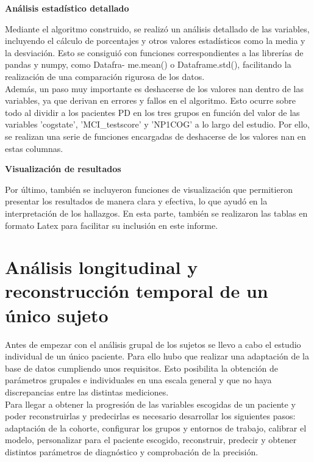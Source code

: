 \begin{description}
	\item {\textbf{Análisis estadístico detallado}} 
	
	Mediante el algoritmo construido, se realizó un análisis detallado de las variables, incluyendo el cálculo de porcentajes y otros valores estadísticos como la media y la desviación. Esto se consiguió con funciones correspondientes a las librerías de pandas y numpy, como Datafra-
	me.mean() o Dataframe.std(), facilitando la realización de una comparación rigurosa de los datos. \\
	
	Además, un paso muy importante es deshacerse de los valores nan dentro de las variables, ya que derivan en errores y fallos en el algoritmo. Esto ocurre sobre todo al dividir a los pacientes PD en los tres grupos en función del valor de las variables 'cogstate', 'MCI\_testscore' y 'NP1COG' a lo largo del estudio. Por ello, se realizan una serie de funciones encargadas de deshacerse de los valores nan en estas columnas.\\	
	
	\item {\textbf{Visualización de resultados}} 
	
	Por último, también se incluyeron funciones de visualización que permitieron presentar los resultados de manera clara y efectiva, lo que ayudó en la interpretación de los hallazgos. En esta parte, también se realizaron las tablas en formato Latex para facilitar su inclusión en este informe.
\end{description}

\section{Análisis longitudinal y reconstrucción temporal de un único sujeto}\label{sec:Análisis de un único sujeto}
Antes de empezar con el análisis grupal de los sujetos se llevo a cabo el estudio individual de un único paciente. Para ello hubo que realizar una adaptación de la base de datos cumpliendo unos requisitos. Esto posibilita la obtención de parámetros grupales e individuales en una escala general y que no haya discrepancias entre las distintas mediciones.\\

Para llegar a obtener la progresión de las variables escogidas de un paciente y poder reconstruirlas y predecirlas es necesario desarrollar los siguientes pasos: adaptación de la cohorte, configurar los grupos y entornos de trabajo, calibrar el modelo, personalizar para el paciente escogido, reconstruir, predecir y obtener distintos parámetros de diagnóstico y comprobación de la precisión.\\

